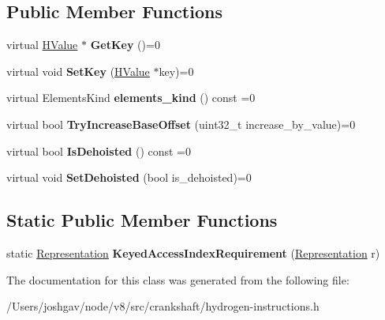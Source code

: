 \subsection*{Public Member Functions}
\begin{DoxyCompactItemize}
\item 
virtual \hyperlink{classv8_1_1internal_1_1_h_value}{H\+Value} $\ast$ {\bfseries Get\+Key} ()=0\hypertarget{classv8_1_1internal_1_1_array_instruction_interface_a3b00965803a4aa2d245049e197386bb9}{}\label{classv8_1_1internal_1_1_array_instruction_interface_a3b00965803a4aa2d245049e197386bb9}

\item 
virtual void {\bfseries Set\+Key} (\hyperlink{classv8_1_1internal_1_1_h_value}{H\+Value} $\ast$key)=0\hypertarget{classv8_1_1internal_1_1_array_instruction_interface_a69d53bd082b5e37c7921cedcfcec11ca}{}\label{classv8_1_1internal_1_1_array_instruction_interface_a69d53bd082b5e37c7921cedcfcec11ca}

\item 
virtual Elements\+Kind {\bfseries elements\+\_\+kind} () const  =0\hypertarget{classv8_1_1internal_1_1_array_instruction_interface_ac041c83bc40455ff09c22caec9607500}{}\label{classv8_1_1internal_1_1_array_instruction_interface_ac041c83bc40455ff09c22caec9607500}

\item 
virtual bool {\bfseries Try\+Increase\+Base\+Offset} (uint32\+\_\+t increase\+\_\+by\+\_\+value)=0\hypertarget{classv8_1_1internal_1_1_array_instruction_interface_a5413df5ba2cb580d7687ae5a44f43123}{}\label{classv8_1_1internal_1_1_array_instruction_interface_a5413df5ba2cb580d7687ae5a44f43123}

\item 
virtual bool {\bfseries Is\+Dehoisted} () const  =0\hypertarget{classv8_1_1internal_1_1_array_instruction_interface_a97a9a64d1f73967ea6e1add74ed71017}{}\label{classv8_1_1internal_1_1_array_instruction_interface_a97a9a64d1f73967ea6e1add74ed71017}

\item 
virtual void {\bfseries Set\+Dehoisted} (bool is\+\_\+dehoisted)=0\hypertarget{classv8_1_1internal_1_1_array_instruction_interface_a83bec181df124504e55948b6847f60ac}{}\label{classv8_1_1internal_1_1_array_instruction_interface_a83bec181df124504e55948b6847f60ac}

\end{DoxyCompactItemize}
\subsection*{Static Public Member Functions}
\begin{DoxyCompactItemize}
\item 
static \hyperlink{classv8_1_1internal_1_1_representation}{Representation} {\bfseries Keyed\+Access\+Index\+Requirement} (\hyperlink{classv8_1_1internal_1_1_representation}{Representation} r)\hypertarget{classv8_1_1internal_1_1_array_instruction_interface_a3e05ea86b4cb765cfb92f4b5f5b504f5}{}\label{classv8_1_1internal_1_1_array_instruction_interface_a3e05ea86b4cb765cfb92f4b5f5b504f5}

\end{DoxyCompactItemize}


The documentation for this class was generated from the following file\+:\begin{DoxyCompactItemize}
\item 
/\+Users/joshgav/node/v8/src/crankshaft/hydrogen-\/instructions.\+h\end{DoxyCompactItemize}
